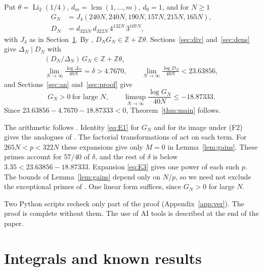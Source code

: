 \documentclass{amsart}
\numberwithin{equation}{section}
\numberwithin{table}{section}
\newcommand{\Li}{\operatorname{Li}}
\newcommand{\Z}{\mathbb{Z}}
\begin{document}
Put $\theta=\Li_2(1/4)$, $d_m=\operatorname{lcm}(1,\dots,m)$, $d_0=1$, and
for $N\ge1$
\begin{equation}\label{eq:GD}
\begin{aligned}
G_N&=J_4(240N,240N,190N,157N,215N,165N),\\
D_N&=d_{323N}\,d_{322N}\,4^{132N}\,3^{107N},
\end{aligned}
\end{equation}
with $J_4$ as in Section~\ref{sec:int}. By \cite[Lemma~2.1]{VZ},
$D_NG_N\in\Z+\Z\theta$. Sections~\ref{sec:div} and~\ref{sec:dens} give
$\Delta_N\mid D_N$ with
\begin{gather*}
(D_N/\Delta_N)\,G_N\in\Z+\Z\theta,\\
\lim_{N\to\infty}\frac{\log\Delta_N}{40N}=\delta>4.7670,\qquad
\lim_{N\to\infty}\frac{\log D_N}{40N}<23.63856,
\end{gather*}
and Sections~\ref{sec:an} and~\ref{sec:proof} give
\[
G_N>0\ \text{for large }N,\qquad
\limsup_{N\to\infty}\frac{\log G_N}{40N}\le-18.87333 .
\]
Since $23.63856-4.7670-18.87333<0$, Theorem~\ref{thm:main} follows.

The arithmetic follows \cite[Section~3.2]{Pr}. Identity \eqref{eq:E1} for
$G_N$ and for its image under (F2) gives the analogues of
\cite[(3.11)--(3.12)]{Pr}. The factorial transformations of \cite{RV05} act on
each term. For $265N<p<322N$ these expansions give only $M=0$ in
Lemma~\ref{lem:gains}. These primes account for $57/40$ of $\delta$, and
the rest of $\delta$ is below $3.35<23.63856-18.87333$. Expansion
\eqref{eq:E3} gives one power of each such $p$. The bounds of
Lemma~\ref{lem:gains} depend only on $N/p$, so we need not exclude the
exceptional primes of \cite[(3.6)--(3.7)]{Pr}. One linear form suffices,
since $G_N>0$ for large $N$.

Two Python scripts recheck only part of the proof (Appendix~\ref{app:ver}).
The proof is complete without them. The use of AI tools is described at the
end of the paper.

\section{Integrals and known results}\label{sec:int}
\end{document}
